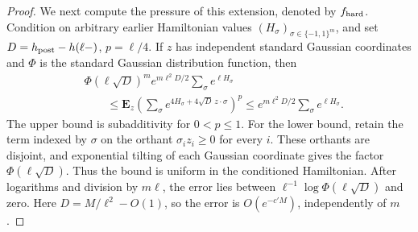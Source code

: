 \begin{proof}
We next compute the pressure of this extension, denoted by
\(f_{\rm hard}\). Condition on arbitrary earlier Hamiltonian values
\((H_\sigma)_{\sigma\in\{-1,1\}^m}\), and set
\(D=h_{\rm post}-h(\ell-)\), \(p=\ell/4\). If
\(z\) has independent standard Gaussian coordinates and \(\Phi\)
is the standard Gaussian distribution function, then
\[
 \begin{split}
 &\Phi(\ell\sqrt D)^m e^{m\ell^2D/2}
          \sum_\sigma e^{\ell H_\sigma}\\
 &\qquad\le
 \mathbf E_z\left(\sum_\sigma
       e^{4H_\sigma+4\sqrt D\,z\cdot\sigma}\right)^p
 \le e^{m\ell^2D/2}\sum_\sigma e^{\ell H_\sigma}.
 \end{split}
\]
The upper bound is subadditivity for \(0<p\le1\). For the lower
bound, retain the term indexed by \(\sigma\) on the orthant
\(\sigma_i z_i\ge0\) for every \(i\). These orthants are disjoint,
and exponential tilting of each Gaussian coordinate gives the factor
\(\Phi(\ell\sqrt D)\). Thus the bound is uniform in the conditioned
Hamiltonian. After logarithms and division by \(m\ell\), the error
lies between \(\ell^{-1}\log\Phi(\ell\sqrt D)\) and zero. Here
\(D=M/\ell^2-O(1)\), so the error is \(O(e^{-c'M})\), independently
of \(m\).


\end{proof}
